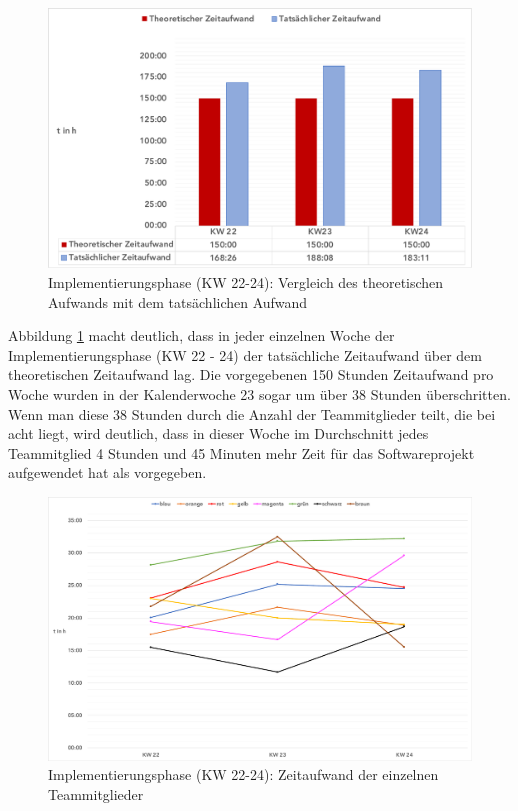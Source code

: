 \documentclass[../review_3.tex]{subfiles}
\begin{document}
\begin{figure} [h]
    \centering
    \includegraphics[width = \linewidth]{img/kimai7.pdf}
    \caption{Implementierungsphase (KW 22-24): Vergleich des theoretischen Aufwands mit dem tatsächlichen Aufwand}
    \label{kimai7}
\end{figure}
Abbildung \ref{kimai7} macht deutlich, dass in jeder einzelnen Woche der Implementierungsphase (KW 22 - 24) der tatsächliche Zeitaufwand über dem theoretischen Zeitaufwand lag. Die vorgegebenen 150 Stunden Zeitaufwand pro Woche wurden in der Kalenderwoche 23 sogar um über 38 Stunden überschritten. Wenn man diese 38 Stunden durch die Anzahl der Teammitglieder teilt, die bei acht liegt, wird deutlich, dass in dieser Woche im Durchschnitt jedes Teammitglied 4 Stunden und 45 Minuten mehr Zeit für das Softwareprojekt aufgewendet hat als vorgegeben.
\begin{figure} [h]
    \centering
    \includegraphics[width = \linewidth]{img/kimai9.pdf}
    \caption{Implementierungsphase (KW 22-24): Zeitaufwand der einzelnen Teammitglieder}
    \label{kimai9}
\end{figure}
\end{document}
